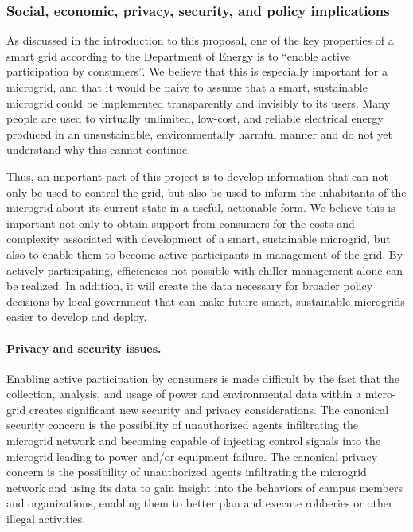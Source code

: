 
\subsubsection{Social, economic, privacy, security, and policy implications}

As discussed in the introduction to this proposal, one of the key
properties of a smart grid according to the Department of Energy is to
``enable active participation by consumers''.  We believe that this is
especially important for a microgrid, and that it would be naive to assume
that a smart, sustainable microgrid could be implemented transparently and
invisibly to its users.  Many people are used to virtually unlimited,
low-cost, and reliable electrical energy produced in an unsustainable,
environmentally harmful manner and do not yet understand why this cannot
continue.

Thus, an important part of this project is to develop information that can
not only be used to control the grid, but also be used to inform the
inhabitants of the microgrid about its current state in a useful,
actionable form.  We believe this is important not only to obtain support
from consumers for the costs and complexity associated with development of
a smart, sustainable microgrid, but also to enable them to become active
participants in management of the grid.  By actively participating,
efficiencies not possible with chiller management alone can be realized.
In addition, it will create the data necessary for broader policy decisions
by local government that can make future smart, sustainable microgrids
easier to develop and deploy.

\paragraph{Privacy and security issues.}

Enabling active participation by consumers is made difficult by the fact
that the collection, analysis, and usage of power and environmental data
within a micro-grid creates significant new security and privacy
considerations.  The canonical security concern is the possibility of
unauthorized agents infiltrating the microgrid network and becoming capable
of injecting control signals into the microgrid leading to power and/or
equipment failure.  The canonical privacy concern is the possibility of
unauthorized agents infiltrating the microgrid network and using its data
to gain insight into the behaviors of campus members and organizations,
enabling them to better plan and execute robberies or other illegal
activities.

